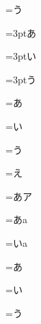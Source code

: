 =\hbox{\rmlh う\kern3pt}


=\hbox{\rmlh \kern3ptあ}

=\hbox{\rmlh \kern3ptい}

=\hbox{\rmlh \kern3ptう}


=\hbox{\rmlh あ\hbox{}}

=\hbox{\rmlh い\hbox{}}

=\hbox{\rmlh う\hbox{}}

=\hbox{\rmlh え\hbox{}}

=\hbox{\rmlh あ\hbox{ア}}

=\hbox{\rmlh あ\hbox{a}}

=\hbox{\rmlh い\hbox{a}}


=\hbox{\rmlh \hbox{}あ}

=\hbox{\rmlh \hbox{}い}

=\hbox{\rmlh \hbox{}う}

